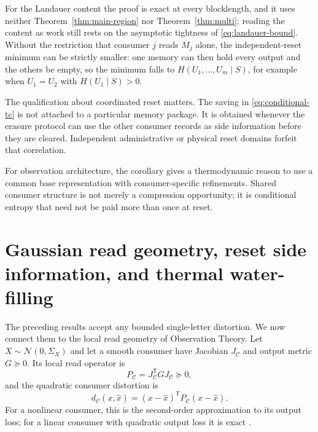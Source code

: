 \documentclass[letterpaper,onecolumn]{IEEEtran}
\theoremstyle{definition}
\theoremstyle{remark}
\newcommand{\cC}{\mathcal{C}}
\newcommand{\PC}{P_{\mathcal{C}}}
\newcommand{\1}{\mathbf{1}}
\begin{document}
For the Landauer content the proof is exact at every blocklength, and it uses
neither Theorem~\ref{thm:main-region} nor Theorem~\ref{thm:multi}; reading the
content as work still rests on the asymptotic tightness of
\eqref{eq:landauer-bound}. Without the restriction that consumer $j$ reads $M_j$
alone, the independent-reset minimum can be strictly smaller: one memory can
then hold every output and the others be empty, so the minimum falls to
$H(U_1,\ldots,U_m\mid S)$, for example when $U_1=U_2$ with $H(U_1\mid S)>0$.

The qualification about coordinated reset matters. The saving in
\eqref{eq:conditional-tc} is not attached to a particular memory package. It is
obtained whenever the erasure protocol can use the other consumer records as
side information before they are cleared. Independent administrative or
physical reset domains forfeit that correlation.

For observation architecture, the corollary gives a thermodynamic reason to use
a common base representation with consumer-specific refinements. Shared
consumer structure is not merely a compression opportunity; it is conditional
entropy that need not be paid more than once at reset.

\section{Gaussian read geometry, reset side information, and thermal water-filling}\label{sec:gaussian}

The preceding results accept any bounded single-letter distortion. We now
connect them to the local read geometry of Observation Theory. Let
$X\sim\mathcal N(0,\Sigma_X)$ and let a smooth consumer have Jacobian $J_{\cC}$
and output metric $G\succeq0$. Its local read operator is
\begin{equation}
 \PC=J_{\cC}^{\mathsf T}GJ_{\cC}\succeq0,
 \label{eq:readop}
\end{equation}
and the quadratic consumer distortion is
\begin{equation}
 d_{\cC}(x,\hat x)=(x-\hat x)^{\mathsf T}\PC(x-\hat x).
 \label{eq:weighted-dist}
\end{equation}
For a nonlinear consumer, this is the second-order approximation to its output
loss; for a linear consumer with quadratic output loss it is exact
\cite{bond2026observation}.
\end{document}
